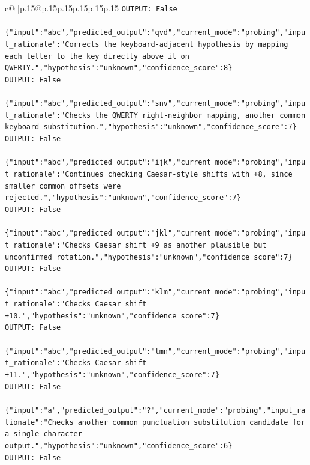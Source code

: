 \documentclass{article}
\begin{document}
{\begin{supertabular}{c@{$\;$}|p{.15\linewidth}@{}p{.15\linewidth}p{.15\linewidth}p{.15\linewidth}p{.15\linewidth}p{.15\linewidth}}
{{{\texttt{OUTPUT: False} \\
\\ 
\texttt{\{"input":"abc","predicted\_output":"qvd","current\_mode":"probing","input\_rationale":"Corrects the keyboard{-}adjacent hypothesis by mapping each letter to the key directly above it on QWERTY.","hypothesis":"unknown","confidence\_score":8\}} \\
\texttt{OUTPUT: False} \\
\\ 
\texttt{\{"input":"abc","predicted\_output":"snv","current\_mode":"probing","input\_rationale":"Checks the QWERTY right{-}neighbor mapping, another common keyboard substitution.","hypothesis":"unknown","confidence\_score":7\}} \\
\texttt{OUTPUT: False} \\
\\ 
\texttt{\{"input":"abc","predicted\_output":"ijk","current\_mode":"probing","input\_rationale":"Continues checking Caesar{-}style shifts with +8, since smaller common offsets were rejected.","hypothesis":"unknown","confidence\_score":7\}} \\
\texttt{OUTPUT: False} \\
\\ 
\texttt{\{"input":"abc","predicted\_output":"jkl","current\_mode":"probing","input\_rationale":"Checks Caesar shift +9 as another plausible but unconfirmed rotation.","hypothesis":"unknown","confidence\_score":7\}} \\
\texttt{OUTPUT: False} \\
\\ 
\texttt{\{"input":"abc","predicted\_output":"klm","current\_mode":"probing","input\_rationale":"Checks Caesar shift +10.","hypothesis":"unknown","confidence\_score":7\}} \\
\texttt{OUTPUT: False} \\
\\ 
\texttt{\{"input":"abc","predicted\_output":"lmn","current\_mode":"probing","input\_rationale":"Checks Caesar shift +11.","hypothesis":"unknown","confidence\_score":7\}} \\
\texttt{OUTPUT: False} \\
\\ 
\texttt{\{"input":"a","predicted\_output":"?","current\_mode":"probing","input\_rationale":"Checks another common punctuation substitution candidate for a single{-}character output.","hypothesis":"unknown","confidence\_score":6\}} \\
\texttt{OUTPUT: False} \\
}}}
\end{supertabular}}
\end{document}
